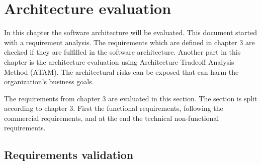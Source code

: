\chapter{Architecture evaluation}
\label{ch:evaluation}
In this chapter the software architecture will be evaluated. This document started with a requirement analysis. The requirements which are defined in chapter 3 are checked if they are fulfilled in the software architecture. Another part in this chapter is the architecture evaluation using Architecture Tradeoff Analysis Method (ATAM). The architectural risks can be exposed that can harm the organization's business goals.

%
The requirements from chapter 3 are evaluated in this section. The section is split according to chapter 3. First  the functional requirements, following the commercial requirements, and at the end the technical non-functional requirements.
\section{Requirements validation}
